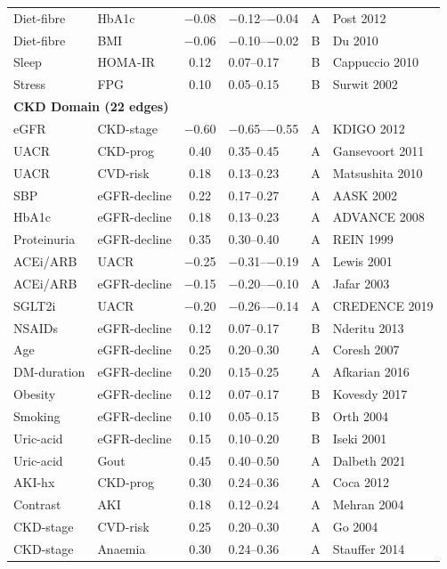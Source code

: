 \documentclass[runningheads]{llncs}
\begin{document}
{\begin{longtable}{@{}p{2.0cm}p{2.0cm}cp{1.4cm}cp{2.8cm}@{}}
Diet-fibre & HbA1c & $-$0.08 & $-$0.12--$-$0.04 & A & Post 2012 \\
Diet-fibre & BMI & $-$0.06 & $-$0.10--$-$0.02 & B & Du 2010 \\
Sleep & HOMA-IR & 0.12 & 0.07--0.17 & B & Cappuccio 2010 \\
Stress & FPG & 0.10 & 0.05--0.15 & B & Surwit 2002 \\
\midrule
\multicolumn{6}{l}{\textbf{CKD Domain (22 edges)}} \\
\midrule
eGFR & CKD-stage & $-$0.60 & $-$0.65--$-$0.55 & A & KDIGO 2012 \\
UACR & CKD-prog & 0.40 & 0.35--0.45 & A & Gansevoort 2011 \\
UACR & CVD-risk & 0.18 & 0.13--0.23 & A & Matsushita 2010 \\
SBP & eGFR-decline & 0.22 & 0.17--0.27 & A & AASK 2002 \\
HbA1c & eGFR-decline & 0.18 & 0.13--0.23 & A & ADVANCE 2008 \\
Proteinuria & eGFR-decline & 0.35 & 0.30--0.40 & A & REIN 1999 \\
ACEi/ARB & UACR & $-$0.25 & $-$0.31--$-$0.19 & A & Lewis 2001 \\
ACEi/ARB & eGFR-decline & $-$0.15 & $-$0.20--$-$0.10 & A & Jafar 2003 \\
SGLT2i & UACR & $-$0.20 & $-$0.26--$-$0.14 & A & CREDENCE 2019 \\
NSAIDs & eGFR-decline & 0.12 & 0.07--0.17 & B & Nderitu 2013 \\
Age & eGFR-decline & 0.25 & 0.20--0.30 & A & Coresh 2007 \\
DM-duration & eGFR-decline & 0.20 & 0.15--0.25 & A & Afkarian 2016 \\
Obesity & eGFR-decline & 0.12 & 0.07--0.17 & B & Kovesdy 2017 \\
Smoking & eGFR-decline & 0.10 & 0.05--0.15 & B & Orth 2004 \\
Uric-acid & eGFR-decline & 0.15 & 0.10--0.20 & B & Iseki 2001 \\
Uric-acid & Gout & 0.45 & 0.40--0.50 & A & Dalbeth 2021 \\
AKI-hx & CKD-prog & 0.30 & 0.24--0.36 & A & Coca 2012 \\
Contrast & AKI & 0.18 & 0.12--0.24 & A & Mehran 2004 \\
CKD-stage & CVD-risk & 0.25 & 0.20--0.30 & A & Go 2004 \\
CKD-stage & Anaemia & 0.30 & 0.24--0.36 & A & Stauffer 2014 \\

\end{longtable}}
\end{document}
